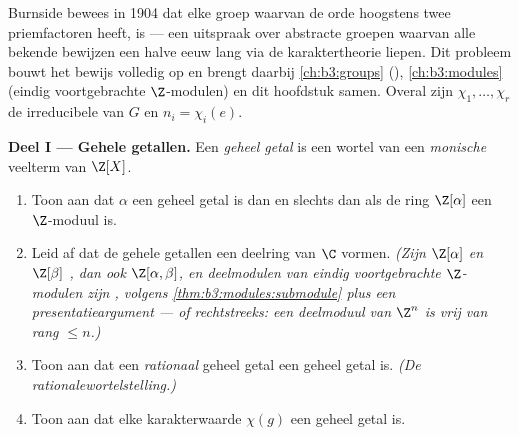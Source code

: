 \begin{problem}\label{pb:b3:representations:1}
Burnside bewees in 1904 dat elke groep waarvan de orde hoogstens
twee priemfactoren heeft,  is --- een uitspraak over
abstracte groepen waarvan alle bekende bewijzen een halve eeuw
lang via de karaktertheorie liepen. Dit probleem bouwt het bewijs
volledig op en brengt daarbij \cref{ch:b3:groups}
(), \cref{ch:b3:modules} (eindig voortgebrachte
$\Z$-modulen) en dit hoofdstuk samen. Overal zijn $\chi_1, \dots,
\chi_r$ de irreducibele  van $G$ en $n_i = \chi_i(e)$.

\medskip
\noindent\textbf{Deel I --- Gehele  getallen.} Een
\emph{geheel  getal} is een wortel van een
\emph{monische} veelterm van $\Z[X]$.
\begin{enumerate}
  \item Toon aan dat $\alpha$ een geheel  getal is dan
        en slechts dan als de ring $\Z[\alpha]$ een  $\Z$-moduul is.
  \item Leid af dat de gehele  getallen een deelring
        van $\C$ vormen. \emph{(Zijn $\Z[\alpha]$ en $\Z[\beta]$
        , dan ook $\Z[\alpha, \beta]$, en
        deelmodulen van eindig voortgebrachte $\Z$-modulen zijn
        , volgens
        \cref{thm:b3:modules:submodule} plus een
        presentatieargument --- of rechtstreeks: een deelmoduul
        van $\Z^n$ is vrij van rang $\leq n$.)}
  \item Toon aan dat een \emph{rationaal} geheel  getal
        een geheel getal is. \emph{(De rationalewortelstelling.)}
  \item Toon aan dat elke karakterwaarde $\chi(g)$ een geheel
         getal is.
\end{enumerate}


\end{problem}
